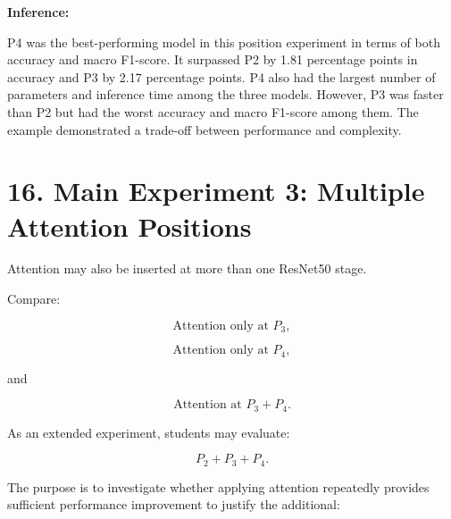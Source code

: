 \documentclass[10pt]{article}
\begin{document}
\begin{table}[H]
\centering
\caption{Performance Comparison for Different CBAM Attention Positions}
\label{tab:cbam_position_results}
\end{table}

\textbf{Inference:}

P4 was the best-performing model in this position experiment in terms of both accuracy and macro F1-score. It surpassed P2 by 1.81 percentage points in accuracy and P3 by 2.17 percentage points. P4 also had the largest number of parameters and inference time among the three models. However, P3 was faster than P2 but had the worst accuracy and macro F1-score among them. The example demonstrated a trade-off between performance and complexity.


\section*{16. Main Experiment 3: Multiple Attention Positions}

Attention may also be inserted at more than one ResNet50 stage.

Compare:

\[
\text{Attention only at }P_3,
\]

\[
\text{Attention only at }P_4,
\]

and

\[
\text{Attention at }P_3+P_4.
\]

As an extended experiment, students may evaluate:

\[
P_2+P_3+P_4.
\]

The purpose is to investigate whether applying attention repeatedly provides
sufficient performance improvement to justify the additional:
\end{document}
